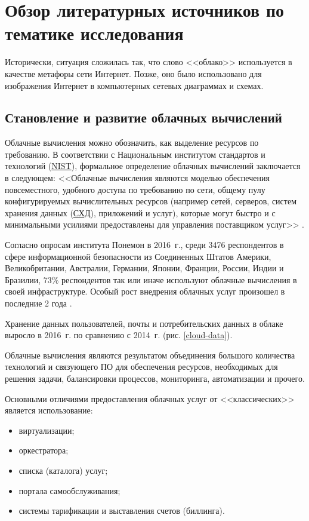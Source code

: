 \section{Обзор литературных источников по тематике исследования}

Исторически, ситуация сложилась так, что слово <<облако>> используется в качестве метафоры сети Интернет.
Позже, оно было использовано для изображения Интернет в компьютерных сетевых диаграммах и схемах.

\subsection{Становление и развитие облачных вычислений}

Облачные вычисления можно обозначить, как выделение ресурсов по требованию.
В соответствии с Национальным институтом стандартов и технологий (\hyperlink{nist}{NIST}), формальное определение облачных вычислений заключается в следующем:
<<Облачные вычисления являются моделью обеспечения повсеместного, удобного доступа по требованию по сети, общему пулу конфигурируемых вычислительных ресурсов (например сетей, серверов, систем хранения данных (\hyperlink{storage}{СХД}), приложений и услуг), которые могут быстро и с минимальными усилиями предоставлены для управления поставщиком услуг>> \cite{nist}.

Согласно опросам института Понемон в 2016~г., среди 3476 респондентов в сфере информационной безопасности из Соединенных Штатов Америки, Великобритании, Австралии, Германии, Японии, Франции, России, Индии и Бразилии, 73\% респондентов так или иначе используют облачные вычисления в своей инфраструктуре.
Особый рост внедрения облачных услуг произошел в последние 2 года \cite{gemalto}.

Хранение данных пользователей, почты и потребительских данных в облаке выросло в 2016~г. по сравнению с 2014~г. (рис. \ref{cloud-data}).


Облачные вычисления являются результатом объединения большого количества технологий и связующего ПО для обеспечения ресурсов, необходимых для решения задачи, балансировки процессов, мониторинга, автоматизации и прочего.

Основными отличиями предоставления облачных услуг от <<классических>> является использование:
\begin{itemize}
  \item виртуализации;
  \item оркестратора;
  \item списка (каталога) услуг;
  \item портала самообслуживания;
  \item системы тарификации и выставления счетов (биллинга).
\end{itemize}

